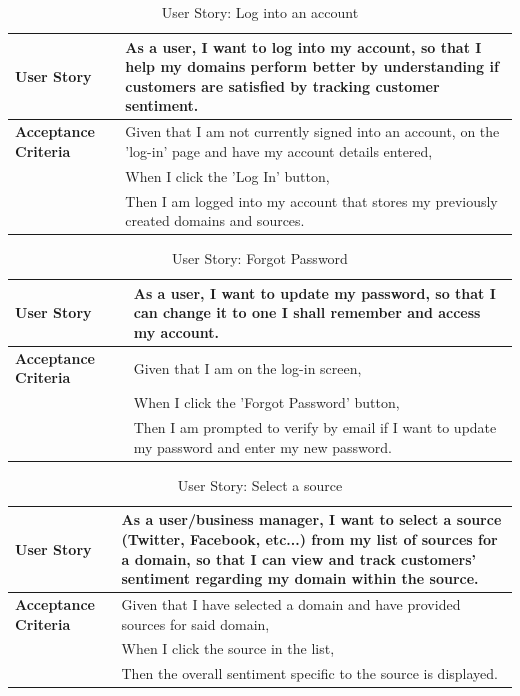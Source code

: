\documentclass[12pt]{article}
\begin{document}
\begin{table}[htbp]
\caption{User Story: Log into an account}
\begin{tabular}{|p{}|p{}|}
\hline
\textbf{User Story} & As a user, I want to log into my account, so that I help my domains perform better by understanding if customers are satisfied by tracking customer sentiment. \\
\hline
\textbf{Acceptance Criteria} & 
Given that I am not currently signed into an account, on the 'log-in' page and have my account details entered,\\
& When I click the 'Log In' button,\\
& Then I am logged into my account that stores my previously created domains and sources. \\
\hline
\end{tabular}
\end{table}

\begin{table}[htbp]
\caption{User Story: Forgot Password}
\begin{tabular}{|p{}|p{}|}
\hline
\textbf{User Story} & As a user, I want to update my password, so that I can change it to one I shall remember and access my account. \\
\hline
\textbf{Acceptance Criteria} & 
Given that I am on the log-in screen,\\
& When I click the 'Forgot Password' button,\\
& Then I am prompted to verify by email if I want to update my password and enter my new password. \\
\hline
\end{tabular}
\end{table}

\begin{table}[htbp]
\caption{User Story: Select a source}
\begin{tabular}{|p{}|p{}|}
\hline
\textbf{User Story} & As a user/business manager, I want to select a source (Twitter, Facebook, etc...) from my list of sources for a domain, so that I can view and track customers' sentiment regarding my domain within the source. \\
\hline
\textbf{Acceptance Criteria} & 
Given that I have selected a domain and have provided sources for said domain,\\
& When I click the source in the list,\\
& Then the overall sentiment specific to the source is displayed. \\
\hline
\end{tabular}
\end{table}
\end{document}
